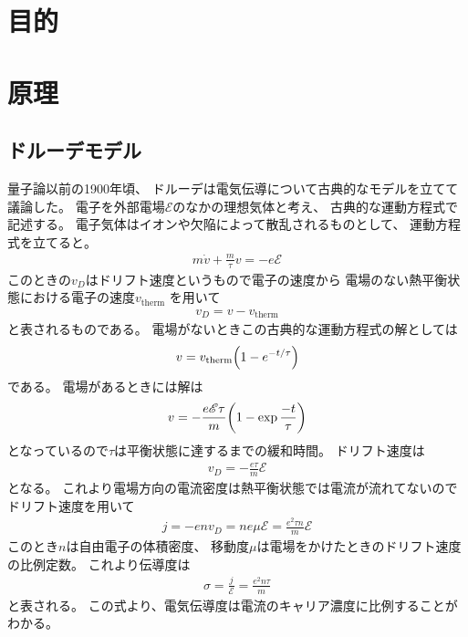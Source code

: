 \documentclass[11pt,dvipdfmx,a4paper]{jsarticle}
\begin{document}
\section{目的}

\section{原理}
\subsection{ドルーデモデル}
量子論以前の1900年頃、
ドルーデは電気伝導について古典的なモデルを立てて議論した。
電子を外部電場\(\mathscr{E}\)のなかの理想気体と考え、
古典的な運動方程式で記述する。
電子気体はイオンや欠陥によって散乱されるものとして、
運動方程式を立てると。
\begin{align}
    m\dot{v} + \frac{m}{\tau}v = -e\mathscr{E} %
\end{align}
このときの\(v_D\)はドリフト速度というもので電子の速度から
電場のない熱平衡状態における電子の速度\(v_{\text{therm}}\)
を用いて
\begin{align}
    v_D= v-v_{\text{therm}}
\end{align}
と表されるものである。
電場がないときこの古典的な運動方程式の解としては
\begin{align}
    v = v_{\text{therm}}\qty(1-e^{-t/\tau})
\end{align}
である。
電場があるときには解は
\begin{align}
    v = -\frac{e\mathscr{E}\tau}{m}\qty(1-\exp\frac{-t}{\tau})
\end{align}
となっているので\(\tau\)は平衡状態に達するまでの緩和時間。
ドリフト速度は
\begin{align}
    v_D=-\frac{e\tau}{m}\mathscr{E} %
\end{align}
となる。
これより電場方向の電流密度は熱平衡状態では電流が流れてないのでドリフト速度を用いて
\begin{align}
    j = -env_D = ne\mu\mathscr{E} = \frac{e^2\tau n}{m}\mathscr{E} %
\end{align}
このとき\(n\)は自由電子の体積密度、
移動度\(\mu\)は電場をかけたときのドリフト速度の比例定数。
これより伝導度は
\begin{align}
    \sigma = \frac{j}{\mathscr{E}} = \frac{e^2n\tau}{m} %
\end{align}
と表される。
この式より、電気伝導度は電流のキャリア濃度に比例することがわかる。
\end{document}
